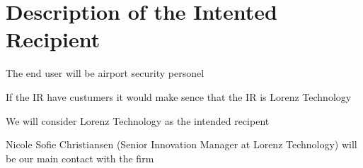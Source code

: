 
\section{Description of the Intented Recipient}
The end user will be airport security personel

If the IR have custumers it would make sence that the IR is Lorenz Technology 

We will consider Lorenz Technology as the intended recipent 

Nicole Sofie Christiansen (Senior Innovation Manager at Lorenz Technology) will be our main contact with the firm



